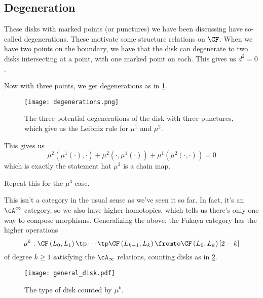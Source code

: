 \documentclass{amsart}
\begin{document}
\subsection{Degeneration}

These disks with marked points (or punctures) we have
been discussing have so-called degenerations. 
These motivate some structure relations on $\CF$.
When we have two points on the boundary, we have that the disk can
degenerate to two disks intersecting at a point, with one marked point
on each. This gives us $d^2 = 0$.

Now with three points, we get degenerations as in
\cref{fig:degenerations}.

\begin{figure}
\texttt{[image: degenerations.png]}
\caption{The three potential degenerations of the disk with three punctures,
which give us the Leibniz rule for $\mu^1$ and $\mu^2$.}
\label{fig:degenerations}
\end{figure}

This gives us
\begin{equation}
\mu^2\left( \mu^1\left( \cdot  \right) , \cdot  \right) +
\mu^2\left( \cdot , \mu^1\left( \cdot \right) \right) + 
\mu^1\left( \mu^2\left( \cdot , \cdot \right) \right) = 0
\end{equation}
which is exactly the statement hat $\mu^2$ is a chain map.

\begin{exr}
Repeat this for the $\mu^3$ case.
\end{exr}

This isn't a category in the usual sense as we've seen it so far. 
In fact, it's an $\cA^\infty$ category,
so we also have higher homotopies, which tells us there's only one way to compose morphisms.
Generalizing the above, 
the Fukaya category has the higher operations 
\begin{equation}
\mu^k:\CF\left( L_0 , L_1 \right) \tp \cdots \tp \CF\left( L_{k-1} , L_k \right)
\fromto \CF\left( L_0 , L_k \right)\left[ 2-k \right]
\end{equation}
of degree $k\geq 1$ satisfying the $\cA_\infty$ relations, counting disks as in \cref{fig:general_disk}.

\begin{figure}
\texttt{[image: general\_disk.pdf]}
\caption{The type of disk counted by $\mu^k$.}
\label{fig:general_disk}
\end{figure}
\end{document}
